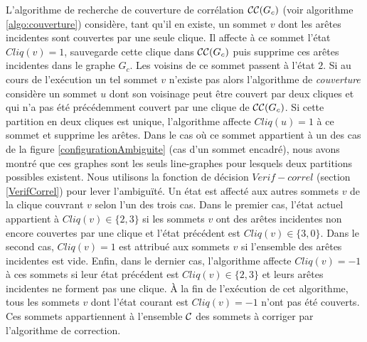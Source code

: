 \FloatBarrier
L'algorithme de recherche de couverture de corr\'elation ${\cal CC}(G_c)$ (voir algorithme \ref{algo:couverture})  consid\`ere, tant qu'il en existe, un sommet $v$ dont les ar\^etes incidentes sont couvertes par une seule clique. 
Il affecte \`a ce sommet l'\'etat $Cliq(v) = 1$, sauvegarde cette clique dans ${\cal CC}(G_c)$ puis supprime ces ar\^etes incidentes dans le graphe $G_c$. Les voisins de ce sommet passent \`a l'\'etat $2$.
\newline
Si au cours de l'ex\'ecution un tel sommet $v$ n'existe pas alors l'algorithme de {\em couverture} consid\`ere un sommet $u$ dont son voisinage peut \^etre couvert par deux cliques et qui n'a pas \'et\'e pr\'ec\'edemment couvert par une clique de ${\cal CC}(G_c)$. 
Si cette partition en deux cliques est unique, l'algorithme affecte $Cliq(u) = 1$ \`a ce sommet et supprime les ar\^etes. 
Dans le cas o\`u ce sommet appartient \`a un des cas de la figure \ref{configurationAmbiguite} (cas d'un sommet encadr\'e), nous avons montr\'e que ces graphes sont les seuls line-graphes pour lesquels deux partitions possibles existent. 
Nous utilisons la fonction de d\'ecision  $Verif-correl$  (section \ref{VerifCorrel}) pour lever l'ambigu\"{i}t\'e.
\newline
Un \'etat est affect\'e aux autres sommets $v$ de la clique couvrant $v$ selon l'un des trois cas. 
Dans le premier cas, l'\'etat actuel appartient \`a $Cliq(v) \in \{2,3\}$ si les sommets $v$ ont des ar\^etes incidentes non encore couvertes par une clique et l'\'etat pr\'ec\'edent est $Cliq(v) \in \{ 3,0\}$. 
Dans le second cas, $Cliq(v) = 1$ est attribu\'e aux sommets $v$ si l'ensemble des ar\^etes incidentes est vide. 
Enfin, dans le dernier cas, l'algorithme  affecte $Cliq(v) = -1$ \`a ces sommets si leur \'etat pr\'ec\'edent est  $Cliq(v) \in \{2,3\}$ et leurs ar\^etes incidentes ne forment pas une clique.
\newline
\`A la fin  de l'ex\'ecution de cet algorithme, tous les sommets $v$ dont l'\'etat courant est $Cliq(v) = -1$  n'ont pas \'et\'e couverts. 
Ces sommets appartiennent \`a l'ensemble $\cal C$ des sommets \`a corriger par l'algorithme de correction.
\newline

